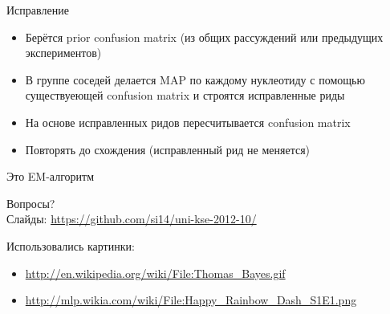 \documentclass[10pt]{beamer}
\begin{document}
\begin{frame}{Исправление}
  \begin{itemize}
  \item Берётся prior confusion matrix (из общих рассуждений или
    предыдущих экспериментов)
  \item В группе соседей делается MAP по каждому нуклеотиду с помощью
    существуеющей confusion matrix и строятся исправленные риды
  \item На основе исправленных ридов пересчитывается confusion matrix
  \item Повторять до схождения (исправленный рид не меняется)
  \end{itemize}
  Это EM-алгоритм
\end{frame}

\begin{frame}[plain]
\end{frame}

\begin{frame}
  \begin{center}
    \Large
    Вопросы?\\
    \vspace{10pt}
    \small
    Слайды: \url{https://github.com/si14/uni-kse-2012-10/}
  \end{center}
\end{frame}

\begin{frame}\label{lastframe}
  \footnotesize
  Использовались картинки:
  \begin{itemize}
    \item \url{http://en.wikipedia.org/wiki/File:Thomas_Bayes.gif}
    \item \url{http://mlp.wikia.com/wiki/File:Happy_Rainbow_Dash_S1E1.png}
  \end{itemize}
\end{frame}
\end{document}
